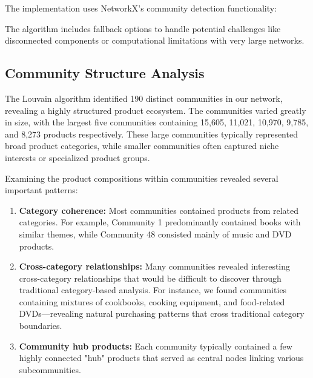 \documentclass[conference]{IEEEtran}
\begin{document}
The implementation uses NetworkX's community detection functionality:

The algorithm includes fallback options to handle potential challenges like disconnected components or computational limitations with very large networks.

\subsection{Community Structure Analysis}
\label{sec:community-analysis}
The Louvain algorithm identified 190 distinct communities in our network, revealing a highly structured product ecosystem. The communities varied greatly in size, with the largest five communities containing 15,605, 11,021, 10,970, 9,785, and 8,273 products respectively. These large communities typically represented broad product categories, while smaller communities often captured niche interests or specialized product groups.

Examining the product compositions within communities revealed several important patterns:

\begin{enumerate}
    \item \textbf{Category coherence:} Most communities contained products from related categories. For example, Community 1 predominantly contained books with similar themes, while Community 48 consisted mainly of music and DVD products.
    
    \item \textbf{Cross-category relationships:} Many communities revealed interesting cross-category relationships that would be difficult to discover through traditional category-based analysis. For instance, we found communities containing mixtures of cookbooks, cooking equipment, and food-related DVDs—revealing natural purchasing patterns that cross traditional category boundaries.
    
    \item \textbf{Community hub products:} Each community typically contained a few highly connected "hub" products that served as central nodes linking various subcommunities.
\end{enumerate}
\end{document}
